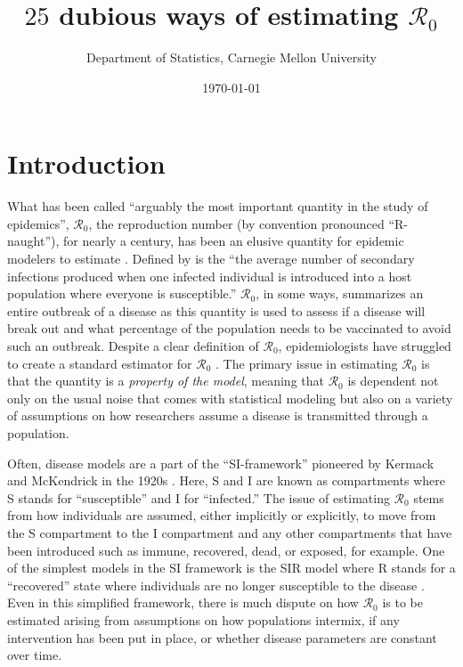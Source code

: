\documentclass[12pt]{article}
\newcommand{\XX}{\ensuremath{25}} %
\newcommand{\rr}{\ensuremath{\mathcal{R}_0}}
\begin{document}




\title{$\XX$ dubious ways of estimating $\rr$}
\author{ Department of Statistics, Carnegie Mellon University}
\date{\today}
\maketitle



\section{Introduction}\label{sec:intro}
What has been called ``arguably the most important quantity in the study of epidemics'', $\mathcal{R}_0$, the reproduction number (by convention pronounced ``R-naught''), for nearly a century, has been an elusive quantity for epidemic modelers to estimate \citep{Heesterbeek2002}.  Defined by \citet{anderson1992} is the ``the average number of secondary infections produced when one infected individual is introduced into a host population where everyone is susceptible.''  $\rr$, in some ways, summarizes an entire outbreak of a disease as this quantity is used to assess if a disease will break out and what percentage of the population needs to be vaccinated to avoid such an outbreak.  Despite a clear definition of $\rr$, epidemiologists have struggled to create a standard  estimator for $\rr$  \citep{hethcote2000}.  The primary issue in estimating $\rr$ is that the quantity is a \textit{property of the model}, meaning that $\rr$ is dependent not only on the usual noise that comes with statistical modeling but also on a variety of assumptions on how researchers assume a disease is transmitted through a population.

Often, disease models are a part of the ``SI-framework'' pioneered by Kermack and McKendrick in the 1920s \citep{getz2006}.  Here, S and I are known as compartments where S stands for ``susceptible'' and I for ``infected.''  The issue of estimating $\rr$ stems from how individuals are assumed, either implicitly or explicitly, to move from the S compartment to the I compartment and any other compartments that have been introduced such as immune, recovered, dead, or exposed, for example.  One of the simplest models in the SI framework is the SIR model where R stands for a ``recovered'' state where individuals are no longer susceptible to the disease \citep{Kermack700}.  Even in this simplified framework, there is much dispute on how $\rr$ is to be estimated arising from assumptions on how populations intermix, if any intervention has been put in place, or whether disease parameters are constant over time.
\end{document}
